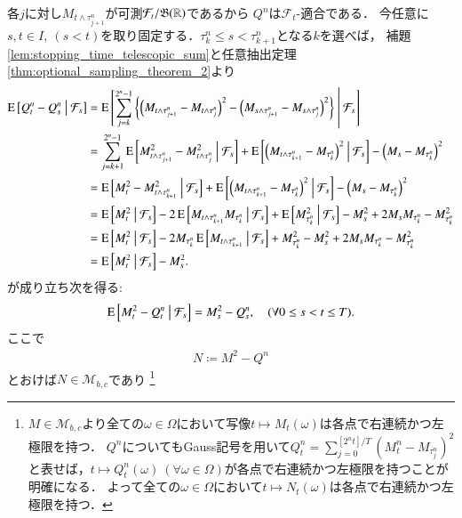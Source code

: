 	\begin{prf}
		各$j$に対し$M_{t \wedge \tau_{j+1}^n}$が可測$\mathcal{F}_t/\mathfrak{B}(\mathbb{R})$であるから
		$Q^n$は$\mathcal{F}_t$-適合である．
		今任意に$s,t \in I,\ (s < t)$を取り固定する．$\tau_k^n \leq s < \tau_{k+1}^n$となる$k$を選べば，
		補題\ref{lem:stopping_time_telescopic_sum}と任意抽出定理\ref{thm:optional_sampling_theorem_2}より
		\begin{align}
			\operatorname{E} \left[ Q_t^n - Q_s^n \ \middle|\ \mathcal{F}_s \right] 
			&= \operatorname{E} \left[ \sum_{j=k}^{2^n-1}\left\{ \left( M_{t\wedge\tau_{j+1}^n} - M_{t\wedge\tau_j^n} \right)^2 - \left( M_{s\wedge\tau_{j+1}^n} - M_{s\wedge\tau_j^n} \right)^2 \right\} \ \middle|\ \mathcal{F}_s \right] \\
			&= \sum_{j=k+1}^{2^n-1} \operatorname{E} \left[  M_{t\wedge\tau_{j+1}^n}^2 - M_{t\wedge\tau_j^n}^2 \ \middle|\ \mathcal{F}_s \right]
				+ \operatorname{E} \left[ \left( M_{t\wedge\tau_{k+1}^n} - M_{\tau_k^n} \right)^2 \ \middle|\ \mathcal{F}_s \right] - \left( M_s - M_{\tau_k^n} \right)^2 \\
			&= \operatorname{E} \left[  M_t^2 - M_{t\wedge\tau_{k+1}^n}^2 \ \middle|\ \mathcal{F}_s \right] + \operatorname{E} \left[ \left( M_{t\wedge\tau_{k+1}^n} - M_{\tau_k^n} \right)^2 \ \middle|\ \mathcal{F}_s \right] - \left( M_s - M_{\tau_k^n} \right)^2 \\
			&= \operatorname{E} \left[ M_t^2 \ \middle|\ \mathcal{F}_s \right] - 2\operatorname{E} \left[ M_{t\wedge\tau_{k+1}^n}M_{\tau_k^n} \ \middle|\ \mathcal{F}_s \right] + \operatorname{E} \left[ M_{\tau_k^n}^2 \ \middle|\ \mathcal{F}_s \right] - M_s^2 + 2M_sM_{\tau_k^n} - M_{\tau_k^n}^2 \\
			&= \operatorname{E} \left[ M_t^2 \ \middle|\ \mathcal{F}_s \right] - 2M_{\tau_k^n}\operatorname{E} \left[ M_{t\wedge\tau_{k+1}^n} \ \middle|\ \mathcal{F}_s \right] + M_{\tau_k^n}^2 - M_s^2 + 2M_sM_{\tau_k^n} - M_{\tau_k^n}^2 \\
			&= \operatorname{E} \left[ M_t^2 \ \middle|\ \mathcal{F}_s \right] - M_s^2.
		\end{align}
		が成り立ち次を得る:
		\begin{align}
			\operatorname{E} \left[ M_t^2 - Q_t^n \ \middle|\ \mathcal{F}_s \right] = M_s^2 - Q_s^n, \quad (\forall 0 \leq s < t \leq T).
			\label{eq:lem_quadratic_variation_1}
		\end{align}
		ここで
		\begin{align}
			N \coloneqq M^2 - Q^n
		\end{align}
		とおけば$N \in \mathcal{M}_{b,c}$であり
		\footnote{
			$M \in \mathcal{M}_{b,c}$より全ての$\omega \in \Omega$において写像$t \longmapsto M_t(\omega)$は各点で右連続かつ左極限を持つ．
			$Q^n$についてもGauss記号を用いて$Q_t^n = \sum_{j=0}^{[2^nt]/T} \left( M_t^n - M_{\tau_j^n} \right)^2$
			と表せば，$t \longmapsto Q_t^n(\omega)\ (\forall \omega \in \Omega)$が各点で右連続かつ左極限を持つことが明確になる．
			よって全ての$\omega \in \Omega$において$t \longmapsto N_t(\omega)$は各点で右連続かつ左極限を持つ．
}
\end{prf}
